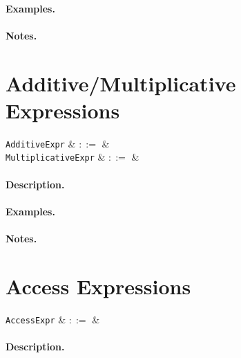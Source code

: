 \paragraph{Examples.}

\paragraph{Notes.} 


\section{Additive/Multiplicative Expressions}

\begin{syntax}
  \verb+AdditiveExpr+ & $::=$ &\\
  \verb+MultiplicativeExpr+ & $::=$ &\\
\end{syntax}

\paragraph{Description.}

\paragraph{Examples.}

\paragraph{Notes.} 


\section{Access Expressions}

\begin{syntax}
  \verb+AccessExpr+ & $::=$ &\\
\end{syntax}

\paragraph{Description.}

